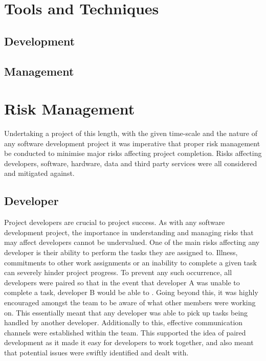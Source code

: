 \section{Tools and Techniques}
\subsection{Development}
\subsection{Management}

\section{Risk Management}
Undertaking a project of this length, with the given time-scale and the nature of any software development project it was imperative that proper risk management be conducted to minimise major risks affecting project completion. Risks affecting developers, software, hardware, data and third party services were all considered and mitigated against.

\subsection{Developer}
Project developers are crucial to project success. As with any software development project, the importance in understanding and managing risks that may affect developers cannot be undervalued. One of the main risks affecting any developer is their ability to perform the tasks they are assigned to. Illness, commitments to other work assignments or an inability to complete a given task can severely hinder project progress. To prevent any such occurrence, all developers were paired so that in the event that developer A was unable to complete a task, developer B would be able to . Going beyond this, it was highly encouraged amongst the team to be aware of what other members were working on. This essentially meant that any developer was able to pick up tasks being handled by another developer. Additionally to this, effective communication channels were established within the team. This supported the idea of paired development as it made it easy for developers to work together, and also meant that potential issues were swiftly identified and dealt with.

